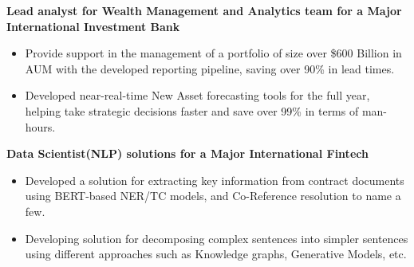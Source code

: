 \documentclass[10pt,a4paper]{altacv}
\begin{document}




\begin{fullwidth}
\makecvheader
\end{fullwidth}



\textbf{Lead analyst for Wealth Management and Analytics team for a Major International Investment Bank}
\begin{itemize}
    \item Provide support in the management of a portfolio of size over \$600 Billion in AUM with the developed reporting pipeline, saving over 90\% in lead times.
    \item Developed near-real-time New Asset forecasting tools for the full year, helping take strategic decisions faster and save over 99\% in terms of man-hours.
\end{itemize}

\vspace{5px}

\textbf{Data Scientist(NLP) solutions for a Major International Fintech}
\begin{itemize}
    \item Developed a solution for extracting key information from contract documents using BERT-based NER/TC models, and Co-Reference resolution to name a few.
    \item Developing solution for decomposing complex sentences into simpler sentences using different approaches such as Knowledge graphs, Generative Models, etc.
\end{itemize}

\vspace{5px}


\end{document}
